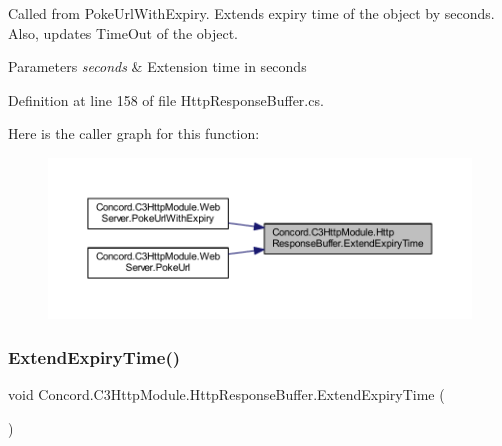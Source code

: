 Called from Poke\+Url\+With\+Expiry. Extends expiry time of the object by \textquotesingle{}seconds\textquotesingle{}. Also, updates Time\+Out of the object. 


\begin{DoxyParams}{Parameters}
{\em seconds} & Extension time in seconds\\
\hline
\end{DoxyParams}


Definition at line 158 of file Http\+Response\+Buffer.\+cs.

Here is the caller graph for this function\+:
\nopagebreak
\begin{figure}[H]
\begin{center}
\leavevmode
\includegraphics[width=350pt]{class_concord_1_1_c3_http_module_1_1_http_response_buffer_abfe159e6516c39e5ad77bdac8350f09b_icgraph}
\end{center}
\end{figure}
\mbox{\label{class_concord_1_1_c3_http_module_1_1_http_response_buffer_a4d61d781c5b28fa7969cbf0fd9ce4720}} 
\subsubsection{\texorpdfstring{ExtendExpiryTime()}{ExtendExpiryTime()}\hspace{0.1cm}{\footnotesize\ttfamily [2/2]}}
{\footnotesize\ttfamily void Concord.\+C3\+Http\+Module.\+Http\+Response\+Buffer.\+Extend\+Expiry\+Time (\begin{DoxyParamCaption}{ }\end{DoxyParamCaption})\hspace{0.3cm}{\ttfamily [inline]}}



